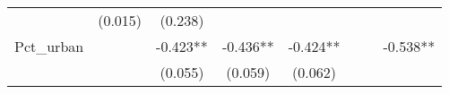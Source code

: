 \documentclass[12pt,twoside]{reedthesis}
\begin{document}
\begin{longtable}[]{@{}lccccccc@{}}
\begin{minipage}[t]{0.10\columnwidth}
  \end{minipage} & \begin{minipage}[t]{0.10\columnwidth}\centering\strut
  (0.015)\strut
  \end{minipage} & \begin{minipage}[t]{0.10\columnwidth}\centering\strut
  (0.238)\strut
  \end{minipage}\tabularnewline
  \begin{minipage}[t]{0.12\columnwidth}\raggedright\strut
  Pct\_urban\strut
  \end{minipage} & \begin{minipage}[t]{0.09\columnwidth}\centering\strut
  \strut
  \end{minipage} & \begin{minipage}[t]{0.10\columnwidth}\centering\strut
  -0.423**\strut
  \end{minipage} & \begin{minipage}[t]{0.10\columnwidth}\centering\strut
  -0.436**\strut
  \end{minipage} & \begin{minipage}[t]{0.10\columnwidth}\centering\strut
  -0.424**\strut
  \end{minipage} & \begin{minipage}[t]{0.10\columnwidth}\centering\strut
  \strut
  \end{minipage} & \begin{minipage}[t]{0.10\columnwidth}\centering\strut
  \strut
  \end{minipage} & \begin{minipage}[t]{0.10\columnwidth}\centering\strut
  -0.538**\strut
  \end{minipage}\tabularnewline
  \begin{minipage}[t]{0.12\columnwidth}\raggedright\strut
  \strut
  \end{minipage} & \begin{minipage}[t]{0.09\columnwidth}\centering\strut
  \strut
  \end{minipage} & \begin{minipage}[t]{0.10\columnwidth}\centering\strut
  (0.055)\strut
  \end{minipage} & \begin{minipage}[t]{0.10\columnwidth}\centering\strut
  (0.059)\strut
  \end{minipage} & \begin{minipage}[t]{0.10\columnwidth}\centering\strut
  (0.062)\strut
  \end{minipage} & \begin{minipage}[t]{0.10\columnwidth}\centering\strut

\end{minipage}
\end{longtable}
\end{document}
